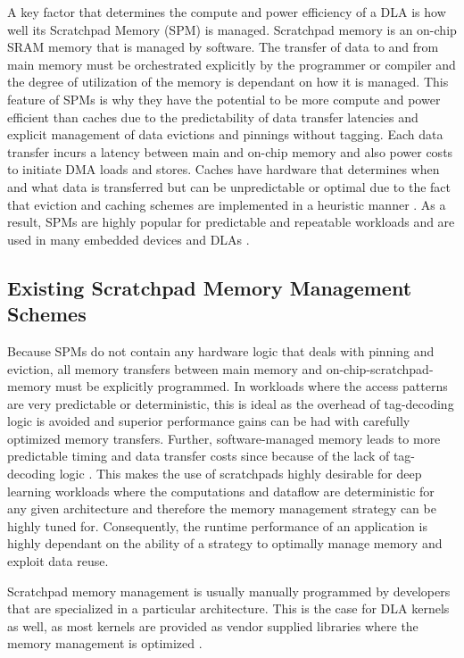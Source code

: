A key factor that determines the compute and power efficiency of a DLA is how
well its Scratchpad Memory (SPM) is managed. Scratchpad memory is an on-chip
SRAM memory that is managed by software. The transfer of data to and from main
memory must be orchestrated explicitly by the programmer or compiler and the
degree of utilization of the memory is dependant on how it is managed.  This
feature of SPMs is why they have the potential to be more compute and power
efficient than caches due to the predictability of data transfer latencies and
explicit management of data evictions and pinnings without tagging.  Each data
transfer incurs a latency between main and on-chip memory and also power costs
to initiate DMA loads and stores. Caches have hardware that determines when and
what data is transferred but can be unpredictable or optimal due to the fact
that eviction and caching schemes are implemented in a heuristic manner
\cite{manyCore}. As a result, SPMs are highly popular for predictable and
repeatable workloads and are used in many embedded devices \cite{graphColoring}
and DLAs \cite{onsram}.

\subsection{Existing Scratchpad Memory Management Schemes}
Because SPMs do not contain any hardware logic that deals with pinning and
eviction, all memory transfers between main memory and on-chip-scratchpad-memory
must be explicitly programmed. In workloads where the access patterns are very
predictable or deterministic, this is ideal as the overhead of tag-decoding
logic is avoided and superior performance gains can be had with carefully
optimized memory transfers. Further, software-managed memory leads to more
predictable timing and data transfer costs since because of the lack of
tag-decoding logic \cite{graphColoring}. This makes the use of scratchpads
highly desirable for deep learning workloads where the computations and
dataflow are deterministic for any given architecture and therefore the
memory management strategy can be highly tuned for. Consequently,
the runtime performance of an application is highly dependant on the
ability of a strategy to optimally manage memory and exploit data reuse.

Scratchpad memory management is usually manually programmed by developers
that are specialized in a particular architecture. This is the case for
DLA kernels as well, as most kernels are provided as vendor supplied libraries
where the memory management is optimized \cite{TVM}.

